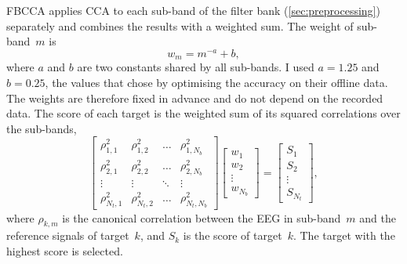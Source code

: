 \ac{FBCCA} applies \ac{CCA} to each sub-band of the filter bank (\cref{sec:preprocessing})
separately and combines the results with a weighted sum. The weight of sub-band~$m$ is
\begin{equation}
    w_m = m^{-a} + b,
    \label{eq:fb-weights}
\end{equation}
where $a$ and $b$ are two constants shared by all sub-bands. I used $a = 1.25$ and
$b = 0.25$, the values that \citet{chen2015fbcca} chose by optimising the accuracy on their
offline data. The weights are therefore fixed in advance and do not depend on the recorded
data. The score of each target is the weighted sum of its squared correlations over the
sub-bands,
\begin{equation}
    \begin{bmatrix}
        \rho_{1,1}^2 & \rho_{1,2}^2 & \dots & \rho_{1,N_b}^2 \\
        \rho_{2,1}^2 & \rho_{2,2}^2 & \dots & \rho_{2,N_b}^2 \\
        \vdots & \vdots & \ddots & \vdots \\
        \rho_{N_t,1}^2 & \rho_{N_t,2}^2 & \dots & \rho_{N_t,N_b}^2
    \end{bmatrix}
    \begin{bmatrix}
        w_1 \\
        w_2 \\
        \vdots \\
        w_{N_b}
    \end{bmatrix}
    =
    \begin{bmatrix}
        S_1 \\
        S_2 \\
        \vdots \\
        S_{N_t}
    \end{bmatrix},
    \label{eq:fbcca-score}
\end{equation}
where $\rho_{k,m}$ is the canonical correlation between the \ac{EEG} in sub-band~$m$ and the
reference signals of target~$k$, and $S_k$ is the score of target~$k$. The target with the
highest score is selected.

